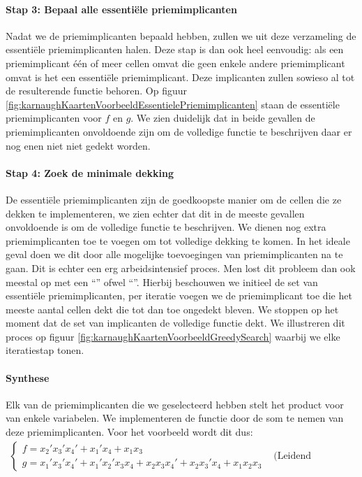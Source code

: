 \paragraph{Stap 3: Bepaal alle essenti\"ele priemimplicanten} Nadat we de priemimplicanten bepaald hebben, zullen we uit deze verzameling de essenti\"ele priemimplicanten halen. Deze stap is dan ook heel eenvoudig: als een priemimplicant \'e\'en of meer cellen omvat die geen enkele andere priemimplicant omvat is het een essenti\"ele priemimplicant. Deze implicanten zullen sowieso al tot de resulterende functie behoren. Op figuur \ref{fig:karnaughKaartenVoorbeeldEssentielePriemimplicanten} staan de essenti\"ele priemimplicanten voor $f$ en $g$. We zien duidelijk dat in beide gevallen de priemimplicanten onvoldoende zijn om de volledige functie te beschrijven daar er nog enen niet niet gedekt worden.
\paragraph{Stap 4: Zoek de minimale dekking}
De essenti\"ele priemimplicanten zijn de goedkoopste manier om de cellen die ze dekken te implementeren, we zien echter dat dit in de meeste gevallen onvoldoende is om de volledige functie te beschrijven. We dienen nog extra priemimplicanten toe te voegen om tot volledige dekking te komen. In het ideale geval doen we dit door alle mogelijke toevoegingen van priemimplicanten na te gaan. Dit is echter een erg arbeidsintensief proces. Men lost dit probleem dan ook meestal op met een ``'' ofwel ``''. Hierbij beschouwen we initieel de set van essenti\"ele priemimplicanten, per iteratie voegen we de priemimplicant toe die het meeste aantal cellen dekt die tot dan toe ongedekt bleven. We stoppen op het moment dat de set van implicanten de volledige functie dekt. We illustreren dit proces op figuur \ref{fig:karnaughKaartenVoorbeeldGreedySearch} waarbij we elke iteratiestap tonen.
\paragraph{Synthese}
Elk van de priemimplicanten die we geselecteerd hebben stelt het product voor van enkele variabelen. We implementeren de functie door de som te nemen van deze priemimplicanten. Voor het voorbeeld wordt dit dus:
\begin{equation}
\begin{array}{ll}
\left\{
\begin{array}{l}
f=x_2'x_3'x_4'+x_1'x_4+x_1x_3\\
g=x_1'x_3'x_4'+x_1'x_2'x_3x_4+x_2x_3x_4'+x_2x_3'x_4+x_1x_2x_3
\end{array}\right.&\mbox{(Leidend voorbeeld)}
\end{array}
\end{equation}
